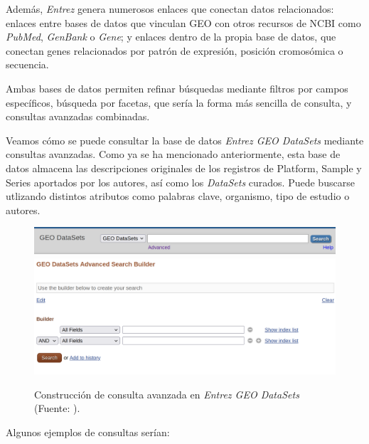 Además, \textit{Entrez} genera numerosos enlaces que conectan datos relacionados: enlaces entre bases de datos que vinculan GEO con otros recursos de NCBI como \textit{PubMed}, \textit{GenBank} o \textit{Gene}; y enlaces
dentro de la propia base de datos, que conectan genes relacionados por patrón de expresión, posición cromosómica o secuencia. \newline

Ambas bases de datos permiten refinar búsquedas mediante filtros por campos específicos, búsqueda por facetas, que sería la forma más sencilla de consulta, y consultas avanzadas combinadas. \newline

Veamos cómo se puede consultar la base de datos \textit{Entrez GEO DataSets} mediante consultas avanzadas. Como ya se ha mencionado anteriormente, esta base de datos almacena las descripciones originales de los registros de Platform, Sample y Series
aportados por los autores, así como los \textit{DataSets} curados. Puede buscarse utlizando distintos atributos como palabras clave, organismo, tipo de estudio o autores. 

\begin{figure}[h]
    \centering
    \includegraphics[width=1\textwidth]{../img/geo-datasets-browser.png}
    \includegraphics[width=1\textwidth]{../img/geo-adv-queryDataset.png}
    \caption{Construcción de consulta avanzada en \textit{Entrez GEO DataSets} (Fuente: \cite{geo-advanced}).}  %
\end{figure}

Algunos ejemplos de consultas serían:

